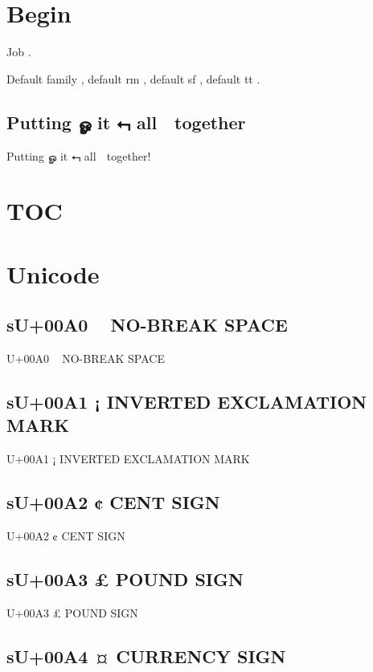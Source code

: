 \section{Begin}

Job \jobname{}.

Default family \familydefault{},
default rm \rmdefault{},
default sf \sfdefault{},
default tt \ttdefault{}.

\subsection{Putting ௐ it ⮢ all 💩 together}

Putting ௐ it ⮢ all 💩 together!

\section{TOC}

\tableofcontents

\section{Unicode}

\subsection{sU+00A0 ~  NO-BREAK SPACE}

U+00A0 ~  NO-BREAK SPACE

\subsection{sU+00A1 ¡  INVERTED EXCLAMATION MARK}

U+00A1 ¡  INVERTED EXCLAMATION MARK

\subsection{sU+00A2 ¢  CENT SIGN}

U+00A2 ¢  CENT SIGN

\subsection{sU+00A3 £  POUND SIGN}

U+00A3 £  POUND SIGN

\subsection{sU+00A4 ¤  CURRENCY SIGN}


